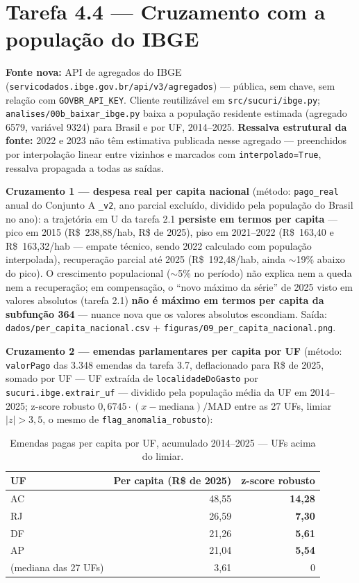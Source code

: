 \documentclass[11pt,a4paper]{article}
\begin{document}
\section{Tarefa 4.4 --- Cruzamento com a população do IBGE}

\textbf{Fonte nova:} API de agregados do IBGE
(\texttt{servicodados.ibge.gov.br/api/v3/agregados}) --- pública, sem
chave, sem relação com \texttt{GOVBR\_API\_KEY}. Cliente reutilizável em
\texttt{src/sucuri/ibge.py}; \texttt{analises/00b\_baixar\_ibge.py} baixa a
população residente estimada (agregado 6579, variável 9324) para Brasil e
por UF, 2014--2025. \textbf{Ressalva estrutural da fonte:} 2022 e 2023 não
têm estimativa publicada nesse agregado --- preenchidos por interpolação
linear entre vizinhos e marcados com \texttt{interpolado=True}, ressalva
propagada a todas as saídas.

\textbf{Cruzamento 1 --- despesa real per capita nacional} (método:
\texttt{pago\_real} anual do Conjunto A \texttt{\_v2}, ano parcial
excluído, dividido pela população do Brasil no ano): a trajetória em U da
tarefa 2.1 \textbf{persiste em termos per capita} --- pico em 2015
(R\$~238,88/hab, R\$ de 2025), piso em 2021--2022 (R\$~163,40 e
R\$~163,32/hab --- empate técnico, sendo 2022 calculado com população
interpolada), recuperação parcial até 2025 (R\$~192,48/hab, ainda
${\sim}$19\% abaixo do pico). O crescimento populacional (${\sim}$5\% no
período) não explica nem a queda nem a recuperação; em compensação, o
``novo máximo da série'' de 2025 visto em valores absolutos (tarefa 2.1)
\textbf{não é máximo em termos per capita da subfunção 364} --- nuance
nova que os valores absolutos escondiam. Saída:
\texttt{dados/per\_capita\_nacional.csv} +
\texttt{figuras/09\_per\_capita\_nacional.png}.

\textbf{Cruzamento 2 --- emendas parlamentares per capita por UF}
(método: \texttt{valorPago} das 3.348 emendas da tarefa 3.7, deflacionado
para R\$ de 2025, somado por UF --- UF extraída de
\texttt{localidadeDoGasto} por \texttt{sucuri.ibge.extrair\_uf} ---
dividido pela população média da UF em 2014--2025; z-score robusto
$0{,}6745\cdot(x-\mathrm{mediana})/\mathrm{MAD}$ entre as 27 UFs, limiar
$|z| > 3{,}5$, o mesmo de \texttt{flag\_anomalia\_robusto}):

\begin{table}[h]
\centering
\begin{tabular}{lrr}
\toprule
UF & Per capita (R\$ de 2025) & z-score robusto \\
\midrule
AC & 48,55 & \textbf{14,28} \\
RJ & 26,59 & \textbf{7,30} \\
DF & 21,26 & \textbf{5,61} \\
AP & 21,04 & \textbf{5,54} \\
(mediana das 27 UFs) & 3,61 & 0 \\
\bottomrule
\end{tabular}
\caption{Emendas pagas per capita por UF, acumulado 2014--2025 --- UFs acima do limiar.}
\end{table}
\end{document}
